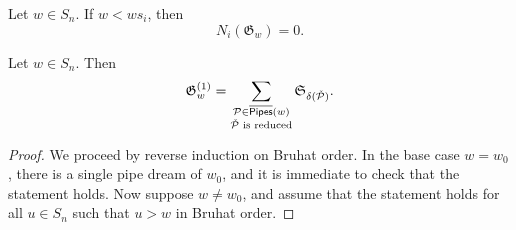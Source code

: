 \documentclass[10pt,a4paper]{amsart}
\newcommand{\demprod}{\delta}
\newcommand{\divdiff}{N}
\newcommand{\kpipes}{\overline{\sf Pipes}}
\begin{document}
		\begin{lemma}
			\label{eq:grothorddivdiff}
			Let $w \in S_n$. If $w < ws_i$, then 
			\[\divdiff_i(\mathfrak{G}_{w}) = 0.\]
		\end{lemma}

		\begin{theorem}
			\label{thm:pipe_groth_to_schub_no_signs}
			Let $w \in S_n$. Then
			\[\mathfrak{G}_w^{(1)} = \sum_{\substack{\mathcal{P} \in \kpipes(w)\\ \check{\mathcal{P}} \text{ is reduced}}}\mathfrak{S}_{\demprod(\check{\mathcal{P}})}. \]
		\end{theorem}

		\begin{proof}
			We proceed by reverse induction on Bruhat order. In the base case $w = w_0$, there is a single pipe dream of $w_0$, and it is immediate to check that the statement holds. 
			Now suppose $w \neq w_0$, and assume that the statement holds for all $u \in S_n$ such that $u > w$ in Bruhat order. 
			

\end{proof}
\end{document}
